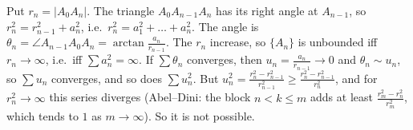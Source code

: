 \documentclass[11pt,a4paper]{article}
\begin{document}
 Put \(r_n=|A_0A_n|\). The triangle \(A_0A_{n-1}A_n\) has its right angle at \(A_{n-1}\), so \(r_n^2=r_{n-1}^2+a_n^2\), i.e.\ \(r_n^2=a_1^2+\dots+a_n^2\). The angle is \(\theta_n=\angle A_{n-1}A_0A_n=\arctan\frac{a_n}{r_{n-1}}\).
 The \(r_n\) increase, so \(\{A_n\}\) is unbounded iff \(r_n\to\infty\), i.e.\ iff \(\sum a_n^2=\infty\). If \(\sum\theta_n\) converges, then \(u_n=\frac{a_n}{r_{n-1}}\to0\) and \(\theta_n\sim u_n\), so \(\sum u_n\) converges, and so does \(\sum u_n^2\).
 But \(u_n^2=\frac{r_n^2-r_{n-1}^2}{r_{n-1}^2}\ge\frac{r_n^2-r_{n-1}^2}{r_n^2}\), and for \(r_n^2\to\infty\) this series diverges (Abel--Dini: the block \(n\lt k\le m\) adds at least \(\frac{r_m^2-r_n^2}{r_m^2}\), which tends to \(1\) as \(m\to\infty\)). So it is not possible.
\end{document}
